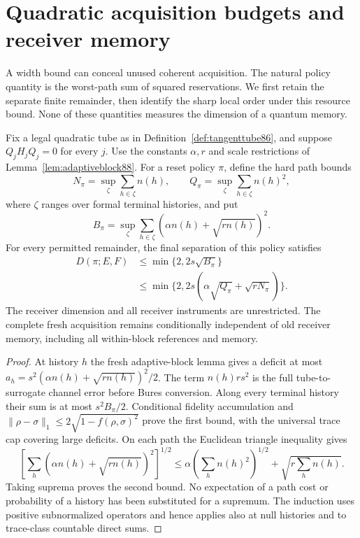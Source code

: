 \section{Quadratic acquisition budgets and receiver memory}
\label{sec:quadraticbudget89}
A width bound can conceal unused coherent acquisition.  The natural
policy quantity is the worst-path sum of squared reservations.  We
first retain the separate finite remainder, then identify the sharp
local order under this resource bound.  None of these quantities
measures the dimension of a quantum memory.

\begin{proposition}\label{prop:policyprofile89}
Fix a legal quadratic tube as in Definition~\ref{def:tangenttube86},
and suppose $Q_jH_jQ_j=0$ for every $j$.  Use the constants
$\alpha,r$ and scale restrictions of Lemma~\ref{lem:adaptiveblock88}.
For a reset policy $\pi$, define the hard path bounds
\[
 N_\pi=\sup_{\zeta}\sum_{h\in\zeta}n(h),\qquad
 Q_\pi=\sup_{\zeta}\sum_{h\in\zeta}n(h)^2,
\]
where $\zeta$ ranges over formal terminal histories, and put
\[
 B_\pi=\sup_{\zeta}\sum_{h\in\zeta}
                  (\alpha n(h)+\sqrt{r n(h)})^2.
\]
For every permitted remainder, the final separation of this policy
satisfies
\begin{equation}\label{eq:policyprofile89}
\begin{split}
 D(\pi;E,F)&\le\min\{2,2s\sqrt{B_\pi}\}\\
 &\le\min\{2,2s(\alpha\sqrt{Q_\pi}+\sqrt{rN_\pi})\}.
\end{split}
\end{equation}
The receiver dimension and all receiver instruments are unrestricted.
The complete fresh acquisition remains conditionally independent of
old receiver memory, including all within-block references and memory.
\end{proposition}
\begin{proof}
At history $h$ the fresh adaptive-block lemma gives a deficit at most
$a_h=s^2(\alpha n(h)+\sqrt{rn(h)})^2/2$.
The term $n(h)rs^2$ is the full tube-to-surrogate channel error before
Bures conversion.  Along every terminal history their sum is at most
$s^2B_\pi/2$.  Conditional fidelity accumulation and
$\|\rho-\sigma\|_1\le2\sqrt{1-f(\rho,\sigma)^2}$ prove the first
bound, with the universal trace cap covering large deficits.
On each path the Euclidean triangle inequality gives
\[
 \left[\sum_h(\alpha n(h)+\sqrt{rn(h)})^2\right]^{1/2}
 \le\alpha\left(\sum_hn(h)^2\right)^{1/2}
                      +\sqrt{r\sum_hn(h)}.
\]
Taking suprema proves the second bound.  No expectation of a path cost
or probability of a history has been substituted for a supremum.
The induction uses positive subnormalized operators and hence applies
also at null histories and to trace-class countable direct sums.
\end{proof}

